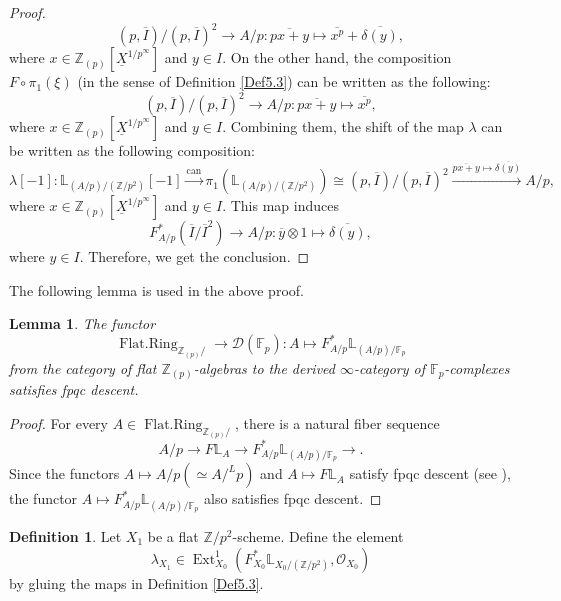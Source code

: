 \documentclass[11pt, a4paper]{amsart}
\theoremstyle{plain}
\newtheorem{lemma}[theorem]{Lemma}
\theoremstyle{definition}
\newtheorem{definition}[theorem]{Definition}
\begin{document}
\begin{proof}
\[(p,\overline I)/(p,\overline I)^2\to A/p:\overline{px+y}\mapsto \overline{x^p}+\overline{\delta(y)},\] where $x\in \mathbb Z_{(p)}[\underline{X}^{1/p^{\infty}}]$ and $y\in I$. On the other hand, the composition $F\circ \pi_1(\xi)$ (in the sense of Definition \ref{Def5.3}) can be written as the following:\[(p,\overline I)/(p,\overline I)^2\to A/p:\overline{px+y}\mapsto \overline{x^p},\] where $x\in \mathbb Z_{(p)}[\underline{X}^{1/p^{\infty}}]$ and $y\in I$. Combining them, the shift of the map $\lambda$ can be written as the following composition:
\[\lambda[-1]:\mathbb L_{(A/p)/(\mathbb Z/p^2)}[-1]\xrightarrow[]{\mathrm{can}}\pi_1(\mathbb L_{(A/p)/(\mathbb Z/p^2)})\cong (p,\overline I)/(p,\overline I)^2\xrightarrow[]{\overline{px+y}\mapsto \overline{\delta(y)}}A/p,\] where $x\in \mathbb Z_{(p)}[\underline{X}^{1/p^{\infty}}]$ and $y\in I$. This map induces \[F_{A/p}^*(\overline I/\overline I^2)\to A/p:\overline y\otimes 1\mapsto \overline{\delta(y)},\] where $y\in I$. Therefore, we get the conclusion.
\end{proof}
The following lemma is used in the above proof.
\begin{lemma}\label{lem5.5}
    The functor\[\operatorname{Flat.Ring}_{\mathbb Z_{(p)}/}\to \mathcal D(\mathbb F_p):A\mapsto F_{A/p}^*\mathbb L_{(A/p)/\mathbb F_p}\] from the category of flat $\mathbb Z_{(p)}$-algebras to the derived $\infty$-category of $\mathbb F_p$-complexes satisfies fpqc descent.
\end{lemma}
\begin{proof}
    For every $A\in \operatorname{Flat.Ring}_{\mathbb Z_{(p)}/}$, there is a natural fiber sequence\[A/p\to F\mathbb L_A\to F_{A/p}^*\mathbb L_{(A/p)/\mathbb F_p}\to.\] Since the functors $A\mapsto A/p(\simeq A/^Lp)$ and $A\mapsto F\mathbb L_{A}$ satisfy fpqc descent (see \cite[Theorem 5.9]{Shi26}), the functor $A\mapsto F^*_{A/p}\mathbb L_{(A/p)/\mathbb F_p}$ also satisfies fpqc descent.
\end{proof}
\begin{definition}\label{def5.6}
    Let $X_1$ be a flat $\mathbb Z/p^2$-scheme. Define the element \[\lambda_{X_1}\in \operatorname{Ext}^1_{X_0}(F_{X_0}^*\mathbb L_{X_0/(\mathbb Z/p^2)},\mathcal O_{X_0})\] by gluing the maps in Definition \ref{Def5.3}.
\end{definition}
\end{document}
